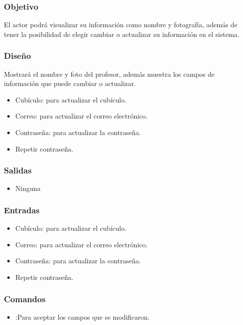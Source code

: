 \subsubsection{Objetivo}
	\noindent
	El actor podrá visualizar su información como nombre y fotografía, además de tener la posibilidad de elegir cambiar o actualizar su información en el sistema. 

\subsubsection{Diseño}
	\noindent
	Mostrará el nombre y foto del profesor, además muestra los campos de información que puede cambiar o actualizar.
	\begin{itemize} 
	\item Cubículo: para actualizar el cubículo.
		\item Correo: para actualizar el correo electrónico.
		\item Contraseña: para actualizar la contraseña.
		\item Repetir contraseña.
	\end{itemize} 



\subsubsection{Salidas}
	\begin{itemize} 
		\item Ninguna
	\end{itemize}

\subsubsection{Entradas}
\begin{itemize} 
	\item Cubículo: para actualizar el cubículo.
		\item Correo: para actualizar el correo electrónico.
		\item Contraseña: para actualizar la contraseña.
		\item Repetir contraseña.
	\end{itemize} 

\subsubsection{Comandos}
\begin{itemize}
	\item {} :Para aceptar los campos que se modificaron.
\end{itemize}

